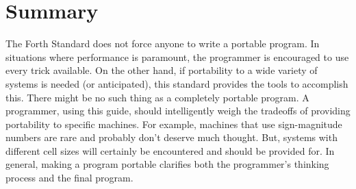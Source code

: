 \section{Summary} %

The Forth Standard does not force anyone to write
a portable program. In situations where performance is paramount,
the programmer is encouraged to use every trick available. On the
other hand, if portability to a wide variety of systems is needed%
(or anticipated), this standard provides the tools to accomplish this. There
might be no such thing as a completely portable program. A programmer, using
this guide, should intelligently weigh the tradeoffs of providing
portability to specific machines. For example, machines that use
sign-magnitude numbers are rare and probably don't deserve much
thought. But, systems with different cell sizes will certainly be
encountered and should be provided for. In general, making a program
portable clarifies both the programmer's thinking process and the
final program.